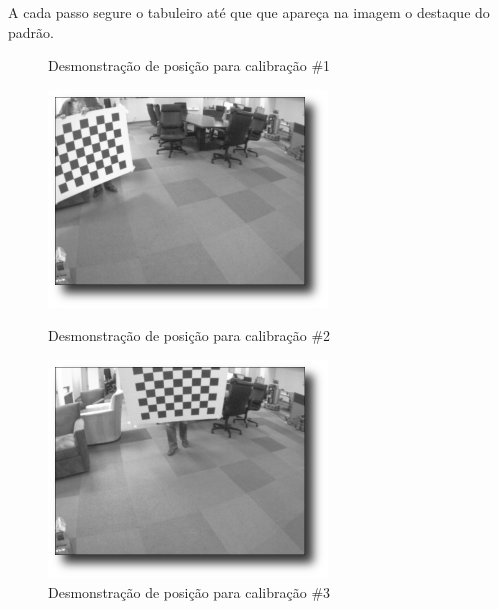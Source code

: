 A cada passo segure o tabuleiro até que que apareça na imagem o destaque do padrão.

\begin{figure}[!htb]
  \caption{Desmonstração de posição para calibração \#1}\label{fig3:14}
  \includegraphics[width=\linewidth]{Imagens/figura3-14.png}
\endminipage\hfill
{}
  \caption{Desmonstração de posição para calibração \#2}\label{fig3:15}
  \includegraphics[width=\linewidth]{Imagens/figura3-15.png}
\endminipage\hfill
{}
  \caption{Desmonstração de posição para calibração \#3}\label{fig3:16}

\end{figure}
